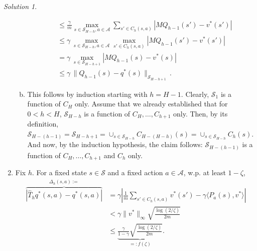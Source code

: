 \documentclass{article}
\newcommand{\norm}[1]{\| #1 \|}
\DeclareMathOperator*{\1}{\mathbbm{1}}
\newcommand{\0}{\mathbf{0}}
\theoremstyle{definition}
\theoremstyle{remark}
\newtheorem*{solution*}{Solution}
\newcommand{\cS}{\mathcal{S}}
\newcommand{\cA}{\mathcal{A}}
\begin{document}
\begin{solution*}
\begin{enumerate}
\begin{enumerate}[(a)]
\begin{align*}
& \le
\frac{\gamma}{m} \max_{s\in \cS_{H-h}, a\in \cA} 
 \sum_{s'\in C_h(s,a)} | M Q_{h-1} (s') - v^*(s') | \\
& \le
\gamma\, \max_{s\in \cS_{H-h}, a\in \cA} 
\max_{s'\in C_h(s,a)}
| M Q_{h-1} (s') - v^*(s') | \\
& =
\gamma\,
\max_{s\in \cS_{H-h+1}} 
| M Q_{h-1} (s) - v^*(s) | \\
& \le
\gamma\,
\norm{ Q_{h-1} (s) - q^*(s) }_{\cS_{H-h+1}}\,.
\end{align*}
\item This follows by induction starting with $h=H-1$. 
Clearly, $\cS_1$ is a function of $C_H$ only.
Assume that  we already established that for
$0<h<H$, $\cS_{H-h}$ is a function of $C_H, \dots, C_{h+1}$ only.
Then,
by its definition,
 $\cS_{H-(h-1)} = \cS_{H-h+1} = \cup_{s\in \cS_{H-h}} C_{H-(H-h)}(s) = \cup_{s\in \cS_{H-h}} C_h(s)$.
And now, by the induction hypothesis, the claim follows:
$\cS_{H-(h-1)}$ is a function of $C_H, \dots, C_{h+1}$ and $C_h$ only.
\end{enumerate}
 
\item Fix $h$.
For a fixed state $s \in \mathcal{S}$ and a fixed action $a \in \mathcal{A}$, w.p. at least $1 - \zeta$,
  \begin{align*}
    \overbrace{\left| \hat{T}_h q^*(s, a) - q^*(s, a) \right|}^{\Delta_h(s,a):=}
    &= \gamma \left| \frac{1}{m} \sum_{s' \in C_h(s, a)} v^*(s') - \gamma \langle P_a(s), v^* \rangle \right| \\
    &< \gamma \|v^*\|_\infty \sqrt{\frac{\log(2 / \zeta)}{2m}} \tag*{(using Hoeffding's inequality)} \\
    &\leq \underbrace{\frac{\gamma}{1 - \gamma} \sqrt{\frac{\log(2 / \zeta)}{2m}}}_{=:f(\zeta)}. \tag*{(since rewards lie in $[0, 1]$)}
  \end{align*}


\end{enumerate}
\end{solution*}
\end{document}
